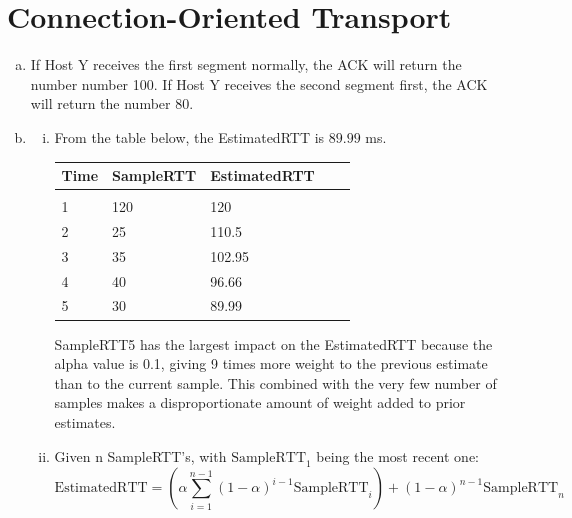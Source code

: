 \documentclass[11pt]{article}
\begin{document}
\section*{Connection-Oriented Transport}
  \begin{enumerate}[(a)]
    \item
      If Host Y receives the first segment normally, the ACK will return the number
      number 100. If Host Y receives the second segment first, the ACK will return the
      number 80.
    \item
      \begin{enumerate}[(i)]
        \item
          From the table below, the EstimatedRTT is $\boxed{89.99}$ ms.

          \begin{table}[H]
            \begin{tabular}{lllll}
            \hline
            Time & SampleRTT & EstimatedRTT &  &  \\
            \hline \\
            1    & 120       & 120          &  &  \\
            2    & 25        & 110.5        &  &  \\
            3    & 35        & 102.95       &  &  \\
            4    & 40        & 96.66        &  &  \\
            5    & 30        & 89.99        &  & \\
            \hline
            \end{tabular}
          \end{table}

          SampleRTT5 has the largest impact on the EstimatedRTT because the alpha
          value is 0.1, giving 9 times more weight to the previous estimate
          than to the current sample. This combined with the very few number of samples
          makes a disproportionate amount of weight added to prior estimates.
        \item
          Given n SampleRTT's, with $\text{SampleRTT}_1$ being the most recent one:
          \[ \text{EstimatedRTT} = \left( \alpha \sum^{n-1}_{i=1} (1 - \alpha)^{i-1} \text{SampleRTT}_i \right) + (1 - \alpha)^{n-1} \text{SampleRTT}_n \]


\end{enumerate}
\end{enumerate}
\end{document}
